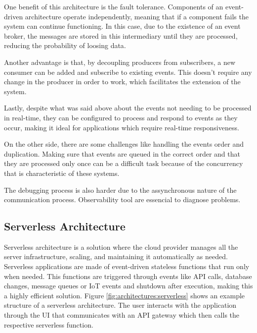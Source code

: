 One benefit of this architecture is the fault tolerance.
Components of an event-driven architecture operate independently, meaning
that if a component fails the system can continue functioning. In this
case, due to the existence of an event broker, the messages are stored in
this intermediary until they are processed, reducing the probability of
loosing data\cite{AWSEventDriven}.

Another advantage is that, by decoupling producers from subscribers, a new
consumer can be added and subscribe to existing events. This doesn't require
any change in the producer in order to work, which facilitates the extension of
the system\cite{MicrosoftEventDriven}.

Lastly, despite what was said above about the events not needing to be processed
in real-time, they can be configured to process and respond to events
as they occur, making it ideal for applications which require real-time
responsiveness\cite{manchana2021event}.

On the other side, there are some challenges like handling the events order and
duplication.
Making sure that events are queued in the correct order and that they are
processed only once can be a difficult task because of the concurrency
that is characteristic of these systems\cite{MicrosoftEventDriven}.

The debugging process is also harder due to the assynchronous nature of the
communication process.
Observability tool are essencial to diagnose problems\cite{manchana2021event}.

\subsection{Serverless Architecture}
Serverless architecture is a solution where the cloud provider manages all the
server infrastructure, scaling, and maintaining it automatically as needed.
Serverless applications are made of event-driven stateless functions that run
only when needed\cite{marcelino2024goldfish}. This functions are triggered
through events like \gls{API} calls, database changes, message queues or
\gls{IoT} events and shutdown after execution, making this a highly efficient
solution\cite{s21030928}.
Figure \ref{fig:architectures:serverless}
shows an example structure of a serverless architecture. The user interacts
with the application through the \gls{UI} that communicates with an \gls{API}
gateway which then calls the respective serverless function.

